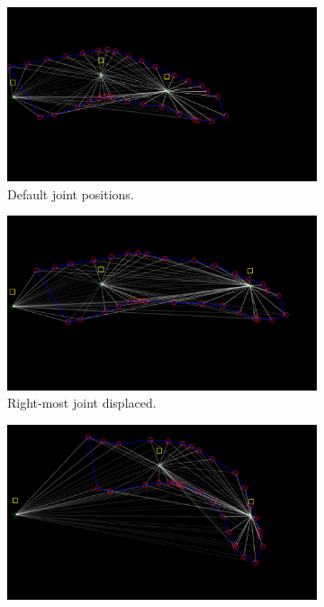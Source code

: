         \begin{figure}[H]
            \centering
            \begin{subfigure}{0.48\linewidth}
            \centering
                \includegraphics[width=1\linewidth]{finger/finger1}
                \caption{Default joint positions.}
            \end{subfigure}
            \begin{subfigure}{0.48\linewidth}
            \centering
                \includegraphics[width=1\linewidth]{finger/finger2}
                \caption{Right-most joint displaced.}
            \end{subfigure}
            \begin{subfigure}{0.48\linewidth}
            \centering
                \includegraphics[width=1\linewidth]{finger/finger3}

\end{subfigure}
\end{figure}
